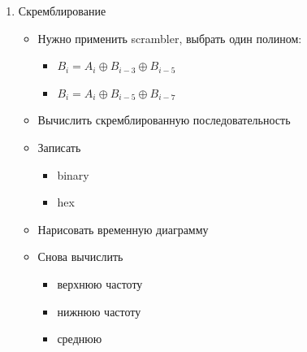 \documentclass[12pt,a4paper]{report}
\begin{document}
\begin{enumerate}
\begin{itemize}
\begin{itemize}
            \item в binary
            \item в hex
        \end{itemize}
        \item Определить
        \begin{itemize}
            \item новую длину сообщения
            \item избыточность
        \end{itemize}
        \item Нарисовать временную диаграмму
        \item Снова посчитать:
        \begin{itemize}
            \item верхнюю частоту
            \item нижнюю частоту
            \item среднюю частоту
            \item полосу пропускания
        \end{itemize}
        \item Сравнить с физическим кодированием
    \end{itemize}
    \item Скремблирование
    \begin{itemize}
        \item Нужно применить scrambler, выбрать один полином:
        \begin{itemize}
            \item $B_i = A_i \oplus B_{i-3} \oplus B_{i-5}$
            \item $B_i = A_i \oplus B_{i-5} \oplus B_{i-7}$
        \end{itemize}
        \item Вычислить скремблированную последовательность
        \item Записать
        \begin{itemize}
            \item binary
            \item hex
        \end{itemize}
        \item Нарисовать временную диаграмму
        \item Снова вычислить
        \begin{itemize}
            \item верхнюю частоту
            \item нижнюю частоту
            \item среднюю

\end{itemize}
\end{itemize}
\end{enumerate}
\end{document}
